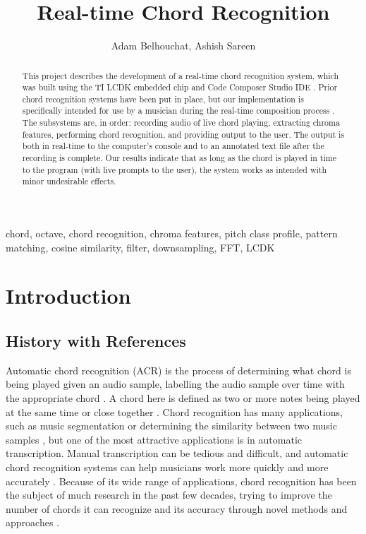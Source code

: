 \documentclass[journal]{IEEEtran}
\begin{document}
\title{Real-time Chord Recognition}
\author{Adam Belhouchat, Ashish Sareen}
\maketitle

\begin{abstract}
    This project describes the development of a real-time chord recognition system, which was built using the TI LCDK embedded chip and Code Composer Studio IDE \cite{lcdk, ccs}.
    Prior chord recognition systems have been put in place, but our implementation is specifically intended for use by a musician during the real-time composition process \cite{stark, cho, harte, lee, mauch_thesis, mauch_simultaneous, jiang, pauwels, fujishima}.
    The subsystems are, in order: recording audio of live chord playing, extracting chroma features, performing chord recognition, and providing output to the user.
    The output is both in real-time to the computer’s console and to an annotated text file after the recording is complete.
    Our results indicate that as long as the chord is played in time to the program (with live prompts to the user), the system works as intended with minor undesirable effects.
\end{abstract}
\begin{IEEEkeywords}
    chord, octave, chord recognition, chroma features, pitch class profile, pattern matching, cosine similarity, filter, downsampling, FFT, LCDK
\end{IEEEkeywords}

\section{Introduction}
\subsection{History with References}
Automatic chord recognition (ACR) is the process of determining what chord is being played given an audio sample, labelling the audio sample over time with the appropriate chord \cite{stark}.
A chord here is defined as two or more notes being played at the same time or close together \cite{cho}.
Chord recognition has many applications, such as music segmentation or determining the similarity between two music samples \cite{lee}, but one of the most attractive applications is in automatic transcription.
Manual transcription can be tedious and difficult, and automatic chord recognition systems can help musicians work more quickly and more accurately \cite{mauch_thesis}.
Because of its wide range of applications, chord recognition has been the subject of much research in the past few decades, trying to improve the number of chords it can recognize and its accuracy through novel methods and approaches \cite{pauwels}.
\end{document}

